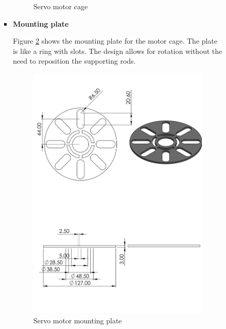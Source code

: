 \begin{enumerate}
\begin{enumerate}
\begin{enumerate}
\begin{itemize}
\begin{figure}[H]
                \caption{Servo motor cage}
                \label{fig:servo_motor_cage}
            \end{figure}
            \par
            \item \textbf{Mounting plate}
            \par
            Figure \ref{fig:servo_motor_mounting_plate} shows the mounting plate for the motor cage. The plate is like a ring with slots. The design allows for rotation without the need to reposition the supporting rods. 
            \par
            \begin{figure}[H]
                \centering
                \includegraphics[height=.75\textheight]{Figures/ServoMotorHolderMount.PNG}
                \caption{Servo motor mounting plate}
                \label{fig:servo_motor_mounting_plate}

\end{figure}
\end{itemize}
\end{enumerate}
\end{enumerate}
\end{enumerate}
